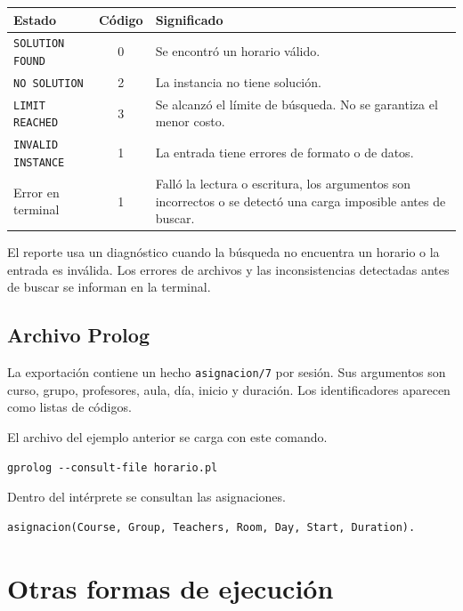 \documentclass[11pt,a4paper]{article}
\begin{document}
\begin{center}
\begin{tabularx}{\linewidth}{@{}lcX@{}}
\toprule
\textbf{Estado} & \textbf{Código} & \textbf{Significado} \\
\midrule
\texttt{SOLUTION FOUND} & 0 & Se encontró un horario válido. \\
\texttt{NO SOLUTION} & 2 & La instancia no tiene solución. \\
\texttt{LIMIT REACHED} & 3 & Se alcanzó el límite de búsqueda. No se garantiza el menor costo. \\
\texttt{INVALID INSTANCE} & 1 & La entrada tiene errores de formato o de datos. \\
Error en terminal & 1 & Falló la lectura o escritura, los argumentos son incorrectos o se detectó una carga imposible antes de buscar. \\
\bottomrule
\end{tabularx}
\end{center}

El reporte usa un diagnóstico cuando la búsqueda no encuentra un horario o la entrada es inválida. Los errores de archivos y las inconsistencias detectadas antes de buscar se informan en la terminal.

\subsection{Archivo Prolog}

La exportación contiene un hecho \texttt{asignacion/7} por sesión. Sus argumentos son curso, grupo, profesores, aula, día, inicio y duración. Los identificadores aparecen como listas de códigos.

El archivo del ejemplo anterior se carga con este comando.

\begin{lstlisting}
gprolog --consult-file horario.pl
\end{lstlisting}

Dentro del intérprete se consultan las asignaciones.

\begin{lstlisting}
asignacion(Course, Group, Teachers, Room, Day, Start, Duration).
\end{lstlisting}

\section{Otras formas de ejecución}
\end{document}
